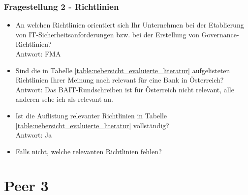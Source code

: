 \subsubsection{Fragestellung 2 - Richtlinien}
\begin{itemize}
    \item An welchen Richtlinien orientiert sich Ihr Unternehmen bei der Etablierung von IT-Sicherheitsanforderungen bzw. bei der Erstellung von Governance-Richtlinien?\\
    Antwort: FMA\\
    \item Sind die in Tabelle \ref{table:uebersicht_evaluierte_literatur} aufgelisteten Richtlinien Ihrer Meinung nach relevant für eine Bank in Österreich?\\
    Antwort: Das BAIT-Rundschreiben ist für Österreich nicht relevant, alle anderen sehe ich als relevant an. \\
    \item Ist die Auflistung relevanter Richtlinien in Tabelle \ref{table:uebersicht_evaluierte_literatur} vollständig?\\
    Antwort: Ja\\
    \item Falls nicht, welche relevanten Richtlinien fehlen?
\end{itemize}
\bigbreak

\section{Peer 3}
